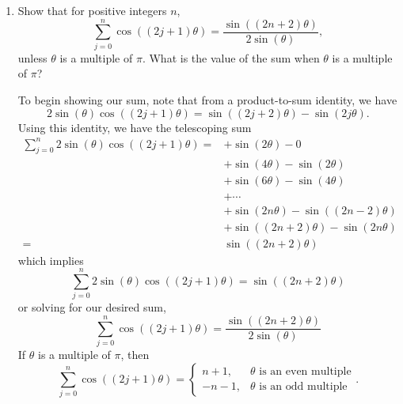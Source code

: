 \documentclass[a4paper,12pt]{article}
\begin{document}
\begin{enumerate}[label = \arabic*.]
\begin{enumerate}[label = (\roman*)]
				\item Show that for positive integers $ n $, 
				\[
					\sum_{j = 0}^{n} \cos((2j + 1) \theta) = \frac{\sin((2n + 2) \theta)}{2 \sin(\theta)},
				\]
				unless $ \theta $ is a multiple of $ \pi $. What is the value of the sum when $ \theta $ is a multiple of $ \pi $?
				
				To begin showing our sum, note that from a product-to-sum identity, we have
				\[
					2 \sin(\theta)\cos((2j + 1) \theta) = \sin((2j + 2) \theta) - \sin(2j \theta).
				\]
				Using this identity, we have the telescoping sum
				\begin{align*}
					\sum_{j = 0}^{n} 2 \sin(\theta) \cos((2j + 1)\theta)  =& +\sin(2 \theta) - 0 \\[-0.5cm]
					& + \sin(4\theta) - \sin(2\theta) \\
					& + \sin(6\theta) - \sin(4\theta) \\
					& + \cdots \\
					& + \sin(2n\theta) - \sin((2n - 2)\theta) \\
					& + \sin((2n + 2)\theta) - \sin(2n\theta) \\
					=& \sin((2n + 2)\theta)
				\end{align*}
				which implies
				\[
					\sum_{j = 0}^{n} 2 \sin(\theta) \cos((2j + 1)\theta) = \sin((2n + 2)\theta)
				\]
				or solving for our desired sum,
				\[
					\boxed{\sum_{j = 0}^{n} \cos((2j + 1)\theta) = \frac{\sin((2n + 2)\theta)}{2 \sin(\theta)}}
				\]
				If $ \theta $ is a multiple of $ \pi $, then
				\[
					\boxed{\sum_{j = 0}^{n} \cos((2j + 1)\theta) = 
						\begin{cases}
							 n + 1, & \theta \text{ is an even multiple} \\ 
							-n - 1, & \theta \text{ is an odd multiple}
						\end{cases}.}
				\]
				

\end{enumerate}
\end{enumerate}
\end{document}
